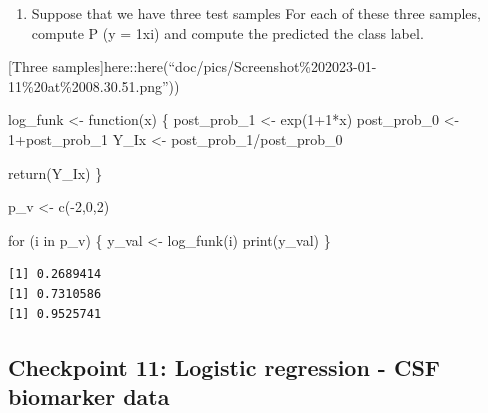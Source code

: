 \documentclass[
  letterpaper,
  DIV=11,
  numbers=noendperiod]{scrartcl}
\newenvironment{Shaded}{\begin{snugshade}}{\end{snugshade}}
\newcommand{\ControlFlowTok}[1]{\textcolor[rgb]{0.00,0.23,0.31}{#1}}
\newcommand{\DecValTok}[1]{\textcolor[rgb]{0.68,0.00,0.00}{#1}}
\newcommand{\FunctionTok}[1]{\textcolor[rgb]{0.28,0.35,0.67}{#1}}
\newcommand{\NormalTok}[1]{\textcolor[rgb]{0.00,0.23,0.31}{#1}}
\newcommand{\OtherTok}[1]{\textcolor[rgb]{0.00,0.23,0.31}{#1}}
\newcommand{\SpecialCharTok}[1]{\textcolor[rgb]{0.37,0.37,0.37}{#1}}
\providecommand{\tightlist}{%
  \setlength{\itemsep}{0pt}\setlength{\parskip}{0pt}}\usepackage{longtable,booktabs,array}
\begin{document}
\begin{enumerate}
\def\labelenumi{(\alph{enumi})}
\setcounter{enumi}{4}
\tightlist
\item
  Suppose that we have three test samples For each of these three
  samples, compute P (y = 1\textbar xi) and compute the predicted the
  class label.
\end{enumerate}

{[}Three
samples{]}here::here(``doc/pics/Screenshot\%202023-01-11\%20at\%2008.30.51.png''))

\begin{Shaded}
\begin{Highlighting}[]
\NormalTok{log\_funk }\OtherTok{\textless{}{-}} \ControlFlowTok{function}\NormalTok{(x) \{}
\NormalTok{post\_prob\_1 }\OtherTok{\textless{}{-}} \FunctionTok{exp}\NormalTok{(}\DecValTok{1}\SpecialCharTok{+}\DecValTok{1}\SpecialCharTok{*}\NormalTok{x)}
\NormalTok{post\_prob\_0 }\OtherTok{\textless{}{-}} \DecValTok{1}\SpecialCharTok{+}\NormalTok{post\_prob\_1}
\NormalTok{Y\_Ix }\OtherTok{\textless{}{-}}\NormalTok{ post\_prob\_1}\SpecialCharTok{/}\NormalTok{post\_prob\_0}

\FunctionTok{return}\NormalTok{(Y\_Ix)}
\NormalTok{\}}
\end{Highlighting}
\end{Shaded}

\begin{Shaded}
\begin{Highlighting}[]
\NormalTok{p\_v }\OtherTok{\textless{}{-}} \FunctionTok{c}\NormalTok{(}\SpecialCharTok{{-}}\DecValTok{2}\NormalTok{,}\DecValTok{0}\NormalTok{,}\DecValTok{2}\NormalTok{)}

\ControlFlowTok{for}\NormalTok{ (i }\ControlFlowTok{in}\NormalTok{ p\_v) \{}
\NormalTok{  y\_val }\OtherTok{\textless{}{-}} \FunctionTok{log\_funk}\NormalTok{(i)}
  \FunctionTok{print}\NormalTok{(y\_val)}
\NormalTok{\}}
\end{Highlighting}
\end{Shaded}

\begin{verbatim}
[1] 0.2689414
[1] 0.7310586
[1] 0.9525741
\end{verbatim}

\hypertarget{checkpoint-11-logistic-regression---csf-biomarker-data}{%
\subsection{Checkpoint 11: Logistic regression - CSF biomarker
data}\label{checkpoint-11-logistic-regression---csf-biomarker-data}}
\end{document}
